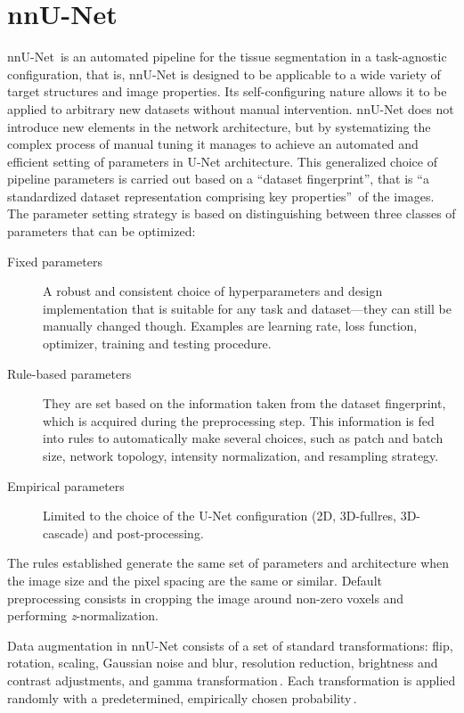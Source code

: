 \section{nnU-Net} \label{sec:nnUNet}
nnU-Net\,\cite{Isensee2021, nnUNet} is an automated pipeline for the tissue segmentation in a task-agnostic configuration, that is, nnU-Net is designed to be applicable to a wide variety of target structures and image properties. Its self-configuring nature allows it to be applied to arbitrary new datasets without manual intervention. nnU-Net does not introduce new elements in the network architecture, but by systematizing the complex process of manual tuning it manages to achieve an automated and efficient setting of parameters in U-Net architecture. This generalized choice of pipeline parameters is carried out based on a \enquote{dataset fingerprint}, that is \enquote{a standardized dataset representation comprising key properties}\,\cite{Isensee2021} of the images. The parameter setting strategy is based on distinguishing between three classes of parameters that can be optimized:
\begin{description}
    \item[Fixed parameters] A robust and consistent choice of hyperparameters and design implementation that is suitable for any task and dataset---they can still be manually changed though. Examples are learning rate, loss function, optimizer, training and testing procedure.
    \item[Rule-based parameters] They are set based on the information taken from the dataset fingerprint, which is acquired during the preprocessing step. This information is fed into rules to automatically make several choices, such as patch and batch size, network topology, intensity normalization, and resampling strategy.
    \item[Empirical parameters] Limited to the choice of the U-Net configuration (2D, 3D-fullres, 3D-cascade) and post-processing.
\end{description}
The rules established generate the same set of parameters and architecture when the image size and the pixel spacing are the same or similar. Default preprocessing consists in cropping the image around non-zero voxels and performing \textit{z}-normalization.

Data augmentation in nnU-Net consists of a set of standard transformations: flip, rotation, scaling, Gaussian noise and blur, resolution reduction, brightness and contrast adjustments, and gamma transformation\,\cite{nnUNet}. Each transformation is applied randomly with a predetermined, empirically chosen probability\,\cite{Isensee2021}.

